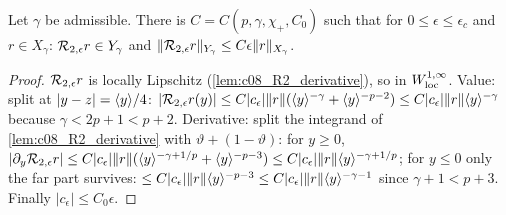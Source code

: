 \begin{lemma}
  \label{lem:c08_R2_bound}
  Let $\gamma$ be admissible. There is $C=C(p,\gamma,\chi_+,C_0)$ such that for $0\le\epsilon\le\epsilon_c$ and $r\in X_\gamma$:
  $\mathcal{R}_{2,\epsilon}r\in Y_\gamma$ and $\|\mathcal{R}_{2,\epsilon}r\|_{Y_\gamma}\le C\epsilon\|r\|_{X_\gamma}$.
\end{lemma}
\begin{proof}
  $\mathcal{R}_{2,\epsilon}r$ is locally Lipschitz (\cref{lem:c08_R2_derivative}), so in $W^{1,\infty}_{\rm loc}$. Value: split at
  $|y-z|=\langle y \rangle/4$: $|\mathcal{R}_{2,\epsilon}r(y)|\le C|c_\epsilon|\|r\|(\langle y \rangle^{-\gamma}+\langle y \rangle^{-p-2})\le C|c_\epsilon|\|r\|\langle y \rangle^{-\gamma}$
  because $\gamma<2p+1<p+2$. Derivative: split the integrand of \cref{lem:c08_R2_derivative} with
  $\vartheta+(1-\vartheta)$: for $y\ge0$, $|\partial_y\mathcal{R}_{2,\epsilon}r|\le C|c_\epsilon|\|r\|(\langle y \rangle^{-\gamma+1/p}+\langle y \rangle^{-p-3})\le C|c_\epsilon|\|r\|\langle y \rangle^{-\gamma+1/p}$;
  for $y\le0$ only the far part survives: $\le C|c_\epsilon|\|r\|\langle y \rangle^{-p-3}\le C|c_\epsilon|\|r\|\langle y \rangle^{-\gamma-1}$ since $\gamma+1<p+3$.
  Finally $|c_\epsilon|\le C_0\epsilon$.
\end{proof}

